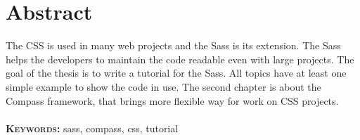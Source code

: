 \chapter*{Abstract}
The CSS is used in many web projects and the Sass is its extension. The Sass helps the developers to maintain the code readable even with large projects. The goal of the thesis is to write a tutorial for the Sass. All topics have at least one simple example to show the code in use. The second chapter is about the Compass framework, that brings more flexible way for work on CSS projects.  \\ \\
\textbf{\textsc{Keywords:}} sass, compass, css, tutorial


